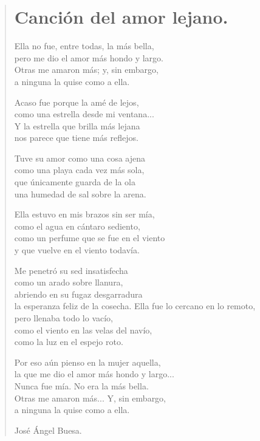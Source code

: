 \documentclass[11pt, portrait, twoside, notitlepage, openright]{book}
\begin{document}
\newpage
\begin{verse}
\begin{center}
\section{Canción del amor lejano.}
\end{center}
Ella no fue, entre todas, la más bella,\\
pero me dio el amor más hondo y largo.\\
Otras me amaron más; y, sin embargo,\\
a ninguna la quise como a ella.
\newline

Acaso fue porque la amé de lejos,\\
como una estrella desde mi ventana...\\
Y la estrella que brilla más lejana\\
nos parece que tiene más reflejos.
\newline

Tuve su amor como una cosa ajena\\
como una playa cada vez más sola,\\
que únicamente guarda de la ola\\
una humedad de sal sobre la arena.
\newline

Ella estuvo en mis brazos sin ser mía,\\
como el agua en cántaro sediento,\\
como un perfume que se fue en el viento\\
y que vuelve en el viento todavía.
\newline

Me penetró su sed insatisfecha\\
como un arado sobre llanura,\\
abriendo en su fugaz desgarradura\\
la esperanza feliz de la cosecha.
\newpage
Ella fue lo cercano en lo remoto,\\
pero llenaba todo lo vacío,\\
como el viento en las velas del navío,\\
como la luz en el espejo roto.
\newline

Por eso aún pienso en la mujer aquella,\\
la que me dio el amor más hondo y largo...\\
Nunca fue mía. No era la más bella.\\
Otras me amaron más... Y, sin embargo,\\
a ninguna la quise como a ella.
\newline

José Ángel Buesa.
\end{verse}
\end{document}
